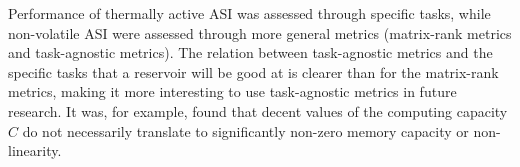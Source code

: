 
Performance of thermally active ASI was assessed through specific tasks, while non-volatile ASI were assessed through more general metrics (matrix-rank metrics and task-agnostic metrics).
The relation between task-agnostic metrics and the specific tasks that a reservoir will be good at is clearer than for the matrix-rank metrics, making it more interesting to use task-agnostic metrics in future research.
It was, for example, found that decent values of the computing capacity $C$ do not necessarily translate to significantly non-zero memory capacity or non-linearity.



